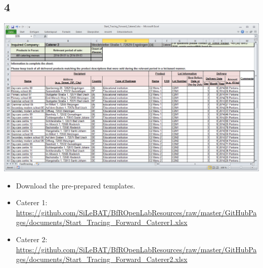 \documentclass{beamer}
\begin{document}
\subsection{4}
\begin{frame}
	\begin{center}
  		\includegraphics[height=0.55\textwidth]{4.png}
	\end{center}
	\begin{itemize}
		\item Download the pre-prepared templates.
		\item Caterer 1: \url{https://github.com/SiLeBAT/BfROpenLabResources/raw/master/GitHubPages/documents/Start_Tracing_Forward_Caterer1.xlsx}
		\item Caterer 2: \url{https://github.com/SiLeBAT/BfROpenLabResources/raw/master/GitHubPages/documents/Start_Tracing_Forward_Caterer2.xlsx}
	\end{itemize}
\end{frame}
\end{document}
